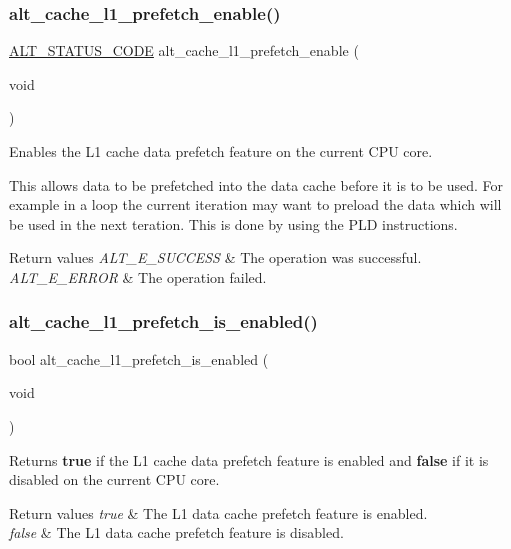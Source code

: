 \subsubsection{\texorpdfstring{alt\_cache\_l1\_prefetch\_enable()}{alt\_cache\_l1\_prefetch\_enable()}}
{\footnotesize\ttfamily \mbox{\hyperlink{hwlib_8h_abdb0d369f069723ca55d6c94bcaaaa12}{A\+L\+T\+\_\+\+S\+T\+A\+T\+U\+S\+\_\+\+C\+O\+DE}} alt\+\_\+cache\+\_\+l1\+\_\+prefetch\+\_\+enable (\begin{DoxyParamCaption}\item[{void}]{ }\end{DoxyParamCaption})}

Enables the L1 cache data prefetch feature on the current C\+PU core.

This allows data to be prefetched into the data cache before it is to be used. For example in a loop the current iteration may want to preload the data which will be used in the next teration. This is done by using the P\+LD instructions.


\begin{DoxyRetVals}{Return values}
{\em A\+L\+T\+\_\+\+E\+\_\+\+S\+U\+C\+C\+E\+SS} & The operation was successful. \\
\hline
{\em A\+L\+T\+\_\+\+E\+\_\+\+E\+R\+R\+OR} & The operation failed. \\
\hline
\end{DoxyRetVals}
\mbox{\label{group__CACHE__L1_ga315c6618b5e9d4f6505ac9836db83d44}} 
\subsubsection{\texorpdfstring{alt\_cache\_l1\_prefetch\_is\_enabled()}{alt\_cache\_l1\_prefetch\_is\_enabled()}}
{\footnotesize\ttfamily bool alt\+\_\+cache\+\_\+l1\+\_\+prefetch\+\_\+is\+\_\+enabled (\begin{DoxyParamCaption}\item[{void}]{ }\end{DoxyParamCaption})}

Returns {\bfseries{true}} if the L1 cache data prefetch feature is enabled and {\bfseries{false}} if it is disabled on the current C\+PU core.


\begin{DoxyRetVals}{Return values}
{\em true} & The L1 data cache prefetch feature is enabled. \\
\hline
{\em false} & The L1 data cache prefetch feature is disabled. \\
\hline
\end{DoxyRetVals}
